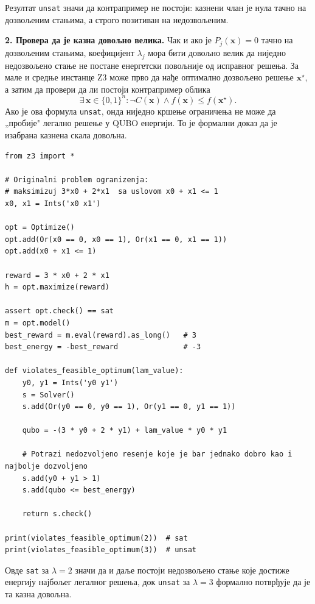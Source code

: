 Резултат \texttt{unsat} значи да контрапример не постоји:
казнени члан је нула тачно на дозвољеним стањима, а строго позитиван
на недозвољеним.

\textbf{2. Провера да је казна довољно велика.}
Чак и ако је $P_j(\mathbf{x}) = 0$ тачно на дозвољеним стањима,
коефицијент $\lambda_j$ мора бити довољно велик да ниједно
недозвољено стање не постане енергетски повољније од исправног решења.
За мале и средње инстанце Z3 може прво да нађе оптимално дозвољено
решење $\mathbf{x}^\star$, а затим да провери да ли постоји
контрапример облика
\[
  \exists\, \mathbf{x}\in\{0,1\}^n :
  \neg C(\mathbf{x}) \land f(\mathbf{x}) \leq f(\mathbf{x}^\star).
\]
Ако је ова формула \texttt{unsat}, онда ниједно кршење ограничења
не може да „пробије" легално решење у QUBO енергији.
То је формални доказ да је изабрана казнена скала довољна.

\begin{example}
\begin{lstlisting}[style=python, caption={Z3 провера да је казнени коефицијент $\lambda$ довољно велик.}]
from z3 import *

# Originalni problem ogranizenja:
# maksimizuj 3*x0 + 2*x1  sa uslovom x0 + x1 <= 1
x0, x1 = Ints('x0 x1')

opt = Optimize()
opt.add(Or(x0 == 0, x0 == 1), Or(x1 == 0, x1 == 1))
opt.add(x0 + x1 <= 1)

reward = 3 * x0 + 2 * x1
h = opt.maximize(reward)

assert opt.check() == sat
m = opt.model()
best_reward = m.eval(reward).as_long()   # 3
best_energy = -best_reward               # -3

def violates_feasible_optimum(lam_value):
    y0, y1 = Ints('y0 y1')
    s = Solver()
    s.add(Or(y0 == 0, y0 == 1), Or(y1 == 0, y1 == 1))

    qubo = -(3 * y0 + 2 * y1) + lam_value * y0 * y1

    # Potrazi nedozvoljeno resenje koje je bar jednako dobro kao i najbolje dozvoljeno
    s.add(y0 + y1 > 1)
    s.add(qubo <= best_energy)

    return s.check()

print(violates_feasible_optimum(2))  # sat
print(violates_feasible_optimum(3))  # unsat
\end{lstlisting}
\end{example}

Овде \texttt{sat} за $\lambda = 2$ значи да и даље постоји
недозвољено стање које достиже енергију најбољег легалног решења,
док \texttt{unsat} за $\lambda = 3$ формално потврђује да је
та казна довољна.

